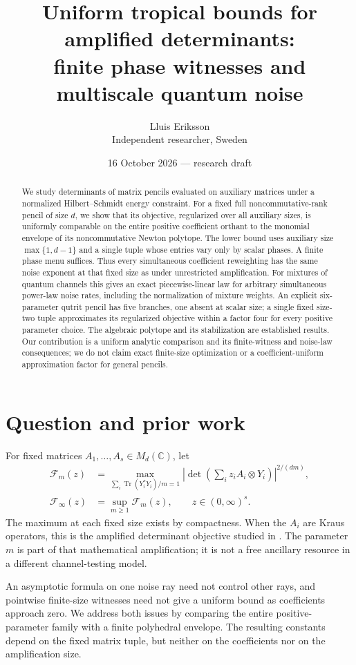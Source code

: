 \documentclass[11pt]{article}
\title{Uniform tropical bounds for amplified determinants:\\finite phase witnesses and multiscale quantum noise}
\author{Lluis Eriksson\\Independent researcher, Sweden}
\date{16 October 2026 --- research draft}
\newcommand{\Tr}{\operatorname{Tr}}
\newcommand{\C}{\mathbb C}
\newcommand{\F}{\mathcal F}
\begin{document}
\maketitle
\begin{abstract}
We study determinants of matrix pencils evaluated on auxiliary matrices under a normalized Hilbert--Schmidt energy constraint. For a fixed full noncommutative-rank pencil of size $d$, we show that its objective, regularized over all auxiliary sizes, is uniformly comparable on the entire positive coefficient orthant to the monomial envelope of its noncommutative Newton polytope. The lower bound uses auxiliary size $\max\{1,d-1\}$ and a single tuple whose entries vary only by scalar phases. A finite phase menu suffices. Thus every simultaneous coefficient reweighting has the same noise exponent at that fixed size as under unrestricted amplification. For mixtures of quantum channels this gives an exact piecewise-linear law for arbitrary simultaneous power-law noise rates, including the normalization of mixture weights. An explicit six-parameter qutrit pencil has five branches, one absent at scalar size; a single fixed size-two tuple approximates its regularized objective within a factor four for every positive parameter choice. The algebraic polytope and its stabilization are established results. Our contribution is a uniform analytic comparison and its finite-witness and noise-law consequences; we do not claim exact finite-size optimization or a coefficient-uniform approximation factor for general pencils.
\end{abstract}
\section{Question and prior work}
For fixed matrices $A_1,\ldots,A_s\in M_d(\C)$, let
\begin{align}
 \F_m(z)&=\max_{\sum_i\Tr(Y_i^*Y_i)/m=1}
 \left|\det\left(\sum_i z_iA_i\otimes Y_i\right)\right|^{2/(dm)},\label{eq:def}\\
 \F_\infty(z)&=\sup_{m\ge1}\F_m(z),\qquad z\in(0,\infty)^s.
\end{align}
The maximum at each fixed size exists by compactness. When the $A_i$ are Kraus operators, this is the amplified determinant objective studied in \cite{sharp,tests}. The parameter $m$ is part of that mathematical amplification; it is not a free ancillary resource in a different channel-testing model.

An asymptotic formula on one noise ray need not control other rays, and pointwise finite-size witnesses need not give a uniform bound as coefficients approach zero. We address both issues by comparing the entire positive-parameter family with a finite polyhedral envelope. The resulting constants depend on the fixed matrix tuple, but neither on the coefficients nor on the amplification size.
\end{document}
